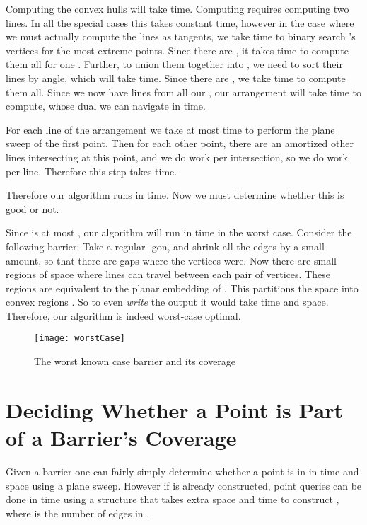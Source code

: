 \documentclass{cccg12}
\begin{document}
Computing the convex hulls will take  time. Computing  requires computing two lines. In all the special cases this takes constant time, however in the case where we must actually compute the lines as tangents, we take  time to binary search 's vertices for the most extreme points. Since there are  , it takes  time to compute them all for one . Further, to union them together into , we need to sort their lines by angle, which will take  time. Since there are  , we take  time to compute them all. Since we now have  lines from all our , our arrangement will take  time to compute, whose dual we can navigate in  time.\cite{Berg08}

For each line of the arrangement we take at most  time to perform the plane sweep of the first point. Then for each other point, there are an amortized   other lines intersecting at this point, and we do  work per intersection, so we do  work per line. Therefore this step takes  time. 

Therefore our algorithm runs in  time. Now we must determine whether this is good or not.

Since  is at most , our algorithm will run in  time in the worst case. Consider the following barrier: Take a regular -gon, and shrink all the edges by a small amount, so that there are gaps where the vertices were. Now there are small regions of space where lines can travel between  each pair of vertices. These regions are equivalent to the planar embedding of . This partitions the space into  convex regions \cite{Freeman76}. So to even \emph{write} the output it would take  time and space. Therefore, our algorithm is indeed worst-case optimal.


\begin{figure}[ht]
  \centering
  \texttt{[image: worstCase]}
  \caption{The worst known case barrier and its coverage}
  \label{fig:worstCase}
\end{figure}

\section{Deciding Whether a Point is Part of a Barrier's Coverage}

Given a barrier  one can fairly simply determine whether a point  is in  in  time and  space using a plane sweep. However if  is already constructed, point queries can be done in  time using a structure that takes  extra space and  time to construct \cite{Kirkpatrick83}, where  is the number of edges in .

\small 


\end{document}
